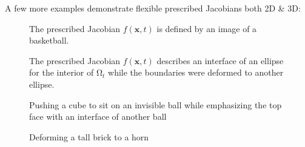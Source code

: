 \documentclass{article}
\theoremstyle{definition}
\theoremstyle{remark}
\numberwithin{equation}{section}
\numberwithin{subsection}{section}
\begin{document}
A few more examples demonstrate flexible prescribed Jacobians both 2D \& 3D:
\begin{figure}[H]
	\caption{The prescribed Jacobian $f(\pmb{x},t)$ is defined by an image of a basketball.}
	\begin{center}
	\end{center}
\end{figure}
\begin{figure}[H]
	\caption{The prescribed Jacobian $f(\pmb{x},t)$ describes an interface of an ellipse for the interior of $\mathrm{\Omega}_t$ while the boundaries were deformed to another ellipse.}
	\begin{center}
	\end{center}	
\end{figure}
\begin{figure}[H]
	\caption{Pushing a cube to sit on an invisible ball while emphasizing the top face with an interface of another ball}
	\begin{center}
	\end{center}
\end{figure}
\begin{figure}[H]
	\caption{Deforming a tall brick to a horn}
	\begin{center}
	\end{center}	
\end{figure}
\end{document}
